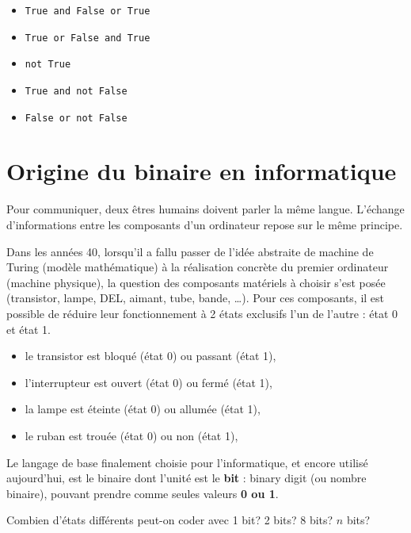 \begin{exercice_cours}{}

\begin{itemize}
	\item \verb|True and False or True| \dotfill
	\item \verb|True or False and True| \dotfill
	\item \verb|not True| \dotfill
	\item \verb|True and not False| \dotfill
	\item \verb|False or not False| \dotfill
\end{itemize}
\end{exercice_cours}

\section{Origine du binaire en informatique}

 Pour communiquer, deux êtres humains doivent parler la même langue. L'échange d'informations entre les composants d'un ordinateur repose sur le même principe.

 Dans les années 40, lorsqu'il a fallu passer de l'idée abstraite de machine de Turing (modèle mathématique) à la réalisation concrète du premier ordinateur (machine physique), la question des composants matériels à choisir s'est posée (transistor, lampe, DEL, aimant, tube, bande, \ldots{}). Pour ces composants, il est possible de réduire leur fonctionnement à 2 états exclusifs l'un de l'autre : état 0 et état 1.

 \begin{itemize}
		\item     le transistor est bloqué (état 0) ou passant (état 1),
		\item     l'interrupteur est ouvert (état 0) ou fermé (état 1),
		\item     la lampe est éteinte (état 0) ou allumée (état 1),
		\item     le ruban est trouée (état 0) ou non (état 1),	
 \end{itemize}

 	Le langage de base finalement choisie pour l'informatique, et encore utilisé aujourd'hui, est le binaire dont l'unité est le \textbf{bit} : binary digit (ou nombre binaire), pouvant prendre comme seules valeurs \textbf{0 ou 1}.


	\begin{exercice_cours}{Combien d'états différents peut-on coder avec 1 bit? 2 bits? 8 bits? $n$ bits? \dotfill}{}
	\end{exercice_cours}

